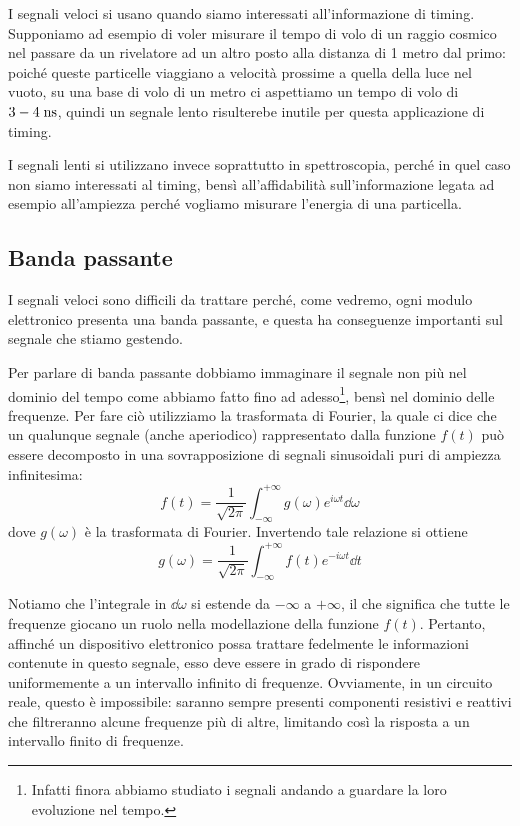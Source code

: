 
I segnali veloci si usano quando siamo interessati all'informazione di timing. Supponiamo ad esempio di voler misurare il tempo di volo di un raggio cosmico nel passare da un rivelatore ad un altro posto alla distanza di 1 metro dal primo: poiché queste particelle viaggiano a velocità prossime a quella della luce nel vuoto, su una base di volo di un metro ci aspettiamo un tempo di volo di $3-4 \; \rm ns$, quindi un segnale lento risulterebe inutile per questa applicazione di timing.

I segnali lenti si utilizzano invece soprattutto in spettroscopia, perché in quel caso non siamo interessati al timing, bensì all'affidabilità sull'informazione legata ad esempio all'ampiezza perché vogliamo misurare l'energia di una particella.

\subsection{Banda passante}
I segnali veloci sono difficili da trattare perché, come vedremo, ogni modulo elettronico presenta una banda passante, e questa ha conseguenze importanti sul segnale che stiamo gestendo.

Per parlare di banda passante dobbiamo immaginare il segnale non più nel dominio del tempo come abbiamo fatto fino ad adesso\footnote{Infatti finora abbiamo studiato i segnali andando a guardare la loro evoluzione nel tempo.}, bensì nel dominio delle frequenze. Per fare ciò utilizziamo la trasformata di Fourier, la quale ci dice che un qualunque segnale (anche aperiodico) rappresentato dalla funzione $f(t)$ può essere decomposto in una sovrapposizione di segnali sinusoidali puri di ampiezza infinitesima:
\begin{equation*}
   f(t)=\frac{1}{\sqrt{2\pi}} \int_{-\infty}^{+\infty} g(\omega) e^{i \omega t} \dd{\omega}
\end{equation*}
dove $g(\omega)$ è la trasformata di Fourier. Invertendo tale relazione si ottiene
\begin{equation*}
   g(\omega)=\frac{1}{\sqrt{2\pi}} \int_{-\infty}^{+\infty} f(t) e^{-i \omega t} \dd{t}
\end{equation*}

Notiamo che l'integrale in $\dd{\omega}$ si estende da $-\infty$ a $+\infty$, il che significa che tutte le frequenze giocano un ruolo nella modellazione della funzione $f(t)$. Pertanto, affinché un dispositivo elettronico possa trattare fedelmente le informazioni contenute in questo segnale, esso deve essere in grado di rispondere uniformemente a un intervallo infinito di frequenze. Ovviamente, in un circuito reale, questo è impossibile: saranno sempre presenti componenti resistivi e reattivi che filtreranno alcune frequenze più di altre, limitando così la risposta a un intervallo finito di frequenze.

